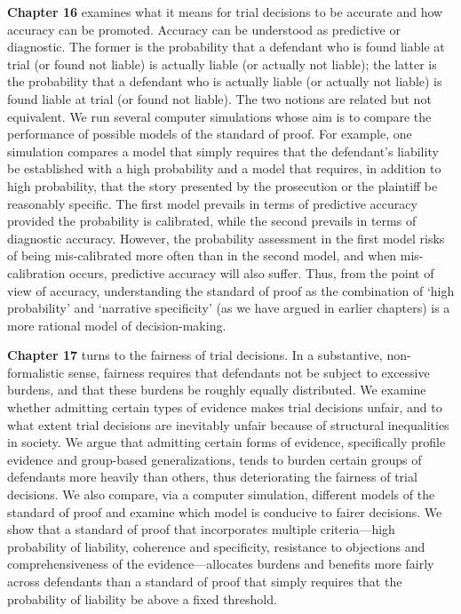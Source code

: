 \documentclass[
  10pt,
  dvipsnames,enabledeprecatedfontcommands]{scrartcl}
\begin{document}
\textbf{Chapter 16} examines what it means for trial decisions to be
accurate and how accuracy can be promoted. Accuracy can be understood as
predictive or diagnostic. The former is the probability that a defendant
who is found liable at trial (or found not liable) is actually liable
(or actually not liable); the latter is the probability that a defendant
who is actually liable (or actually not liable) is found liable at trial
(or found not liable). The two notions are related but not equivalent.
We run several computer simulations whose aim is to compare the
performance of possible models of the standard of proof. For example,
one simulation compares a model that simply requires that the
defendant's liability be established with a high probability and a model
that requires, in addition to high probability, that the story presented
by the prosecution or the plaintiff be reasonably specific. The first
model prevails in terms of predictive accuracy provided the probability
is calibrated, while the second prevails in terms of diagnostic
accuracy. However, the probability assessment in the first model risks
of being mis-calibrated more often than in the second model, and when
mis-calibration occurs, predictive accuracy will also suffer. Thus, from
the point of view of accuracy, understanding the standard of proof as
the combination of `high probability' and `narrative specificity' (as we
have argued in earlier chapters) is a more rational model of
decision-making.

\textbf{Chapter 17} turns to the fairness of trial decisions. In a
substantive, non-formalistic sense, fairness requires that defendants
not be subject to excessive burdens, and that these burdens be roughly
equally distributed. We examine whether admitting certain types of
evidence makes trial decisions unfair, and to what extent trial
decisions are inevitably unfair because of structural inequalities in
society. We argue that admitting certain forms of evidence, specifically
profile evidence and group-based generalizations, tends to burden
certain groups of defendants more heavily than others, thus
deteriorating the fairness of trial decisions. We also compare, via a
computer simulation, different models of the standard of proof and
examine which model is conducive to fairer decisions. We show that a
standard of proof that incorporates multiple criteria---high probability
of liability, coherence and specificity, resistance to objections and
comprehensiveness of the evidence---allocates burdens and benefits more
fairly across defendants than a standard of proof that simply requires
that the probability of liability be above a fixed threshold.
\end{document}

